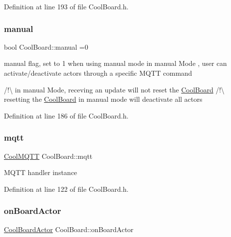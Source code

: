 Definition at line 193 of file Cool\+Board.\+h.

\mbox{\label{class_cool_board_a7c8e505a5804b109e112d5a03df6ea2b}} 
\subsubsection{\texorpdfstring{manual}{manual}}
{\footnotesize\ttfamily bool Cool\+Board\+::manual =0\hspace{0.3cm}{\ttfamily [private]}}

manual flag, set to 1 when using manual mode in manual Mode , user can activate/deactivate actors through a specific M\+Q\+TT command

/!\textbackslash{} in manual Mode, receving an update will not reset the \hyperlink{class_cool_board}{Cool\+Board} /!\textbackslash{} resetting the \hyperlink{class_cool_board}{Cool\+Board} in manual mode will deactivate all actors 

Definition at line 186 of file Cool\+Board.\+h.

\mbox{\label{class_cool_board_a2399f44d7c23c1149a335cb3b46d90f1}} 
\subsubsection{\texorpdfstring{mqtt}{mqtt}}
{\footnotesize\ttfamily \hyperlink{class_cool_m_q_t_t}{Cool\+M\+Q\+TT} Cool\+Board\+::mqtt\hspace{0.3cm}{\ttfamily [private]}}

M\+Q\+TT handler instance 

Definition at line 122 of file Cool\+Board.\+h.

\mbox{\label{class_cool_board_a4ac693895c21025b8808653f2a4316e6}} 
\subsubsection{\texorpdfstring{on\+Board\+Actor}{onBoardActor}}
{\footnotesize\ttfamily \hyperlink{class_cool_board_actor}{Cool\+Board\+Actor} Cool\+Board\+::on\+Board\+Actor\hspace{0.3cm}{\ttfamily [private]}}

